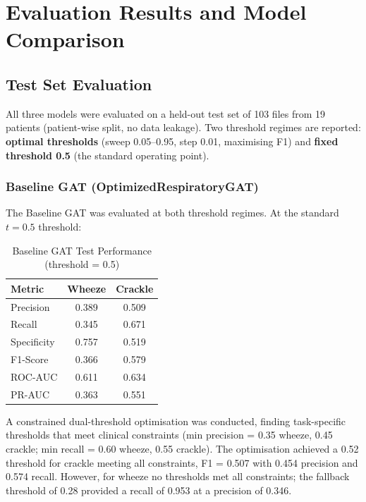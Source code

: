 \section{Evaluation Results and Model Comparison}
\label{sec:evaluation}

\subsection{Test Set Evaluation}

All three models were evaluated on a held-out test set of 103 files from 19
patients (patient-wise split, no data leakage). Two threshold regimes are
reported: \textbf{optimal thresholds} (sweep 0.05--0.95, step 0.01, maximising
F1) and \textbf{fixed threshold 0.5} (the standard operating point).

\subsubsection{Baseline GAT (OptimizedRespiratoryGAT)}

The Baseline GAT was evaluated at both threshold regimes. At the standard
$t=0.5$ threshold:

\begin{table}[!h]
  \renewcommand{\arraystretch}{1.15}
  \caption{Baseline GAT Test Performance (threshold = 0.5)}
  \label{tab:baseline_gat_fixed}
  \centering
  \begin{tabular}{@{}lcc@{}}
    \toprule
    \textbf{Metric} & \textbf{Wheeze} & \textbf{Crackle} \\
    \midrule
    Precision        & 0.389 & 0.509 \\
    Recall           & 0.345 & 0.671 \\
    Specificity      & 0.757 & 0.519 \\
    F1-Score         & 0.366 & 0.579 \\
    ROC-AUC          & 0.611 & 0.634 \\
    PR-AUC           & 0.363 & 0.551 \\
    \bottomrule
  \end{tabular}
\end{table}

A constrained dual-threshold optimisation was conducted, finding task-specific
thresholds that meet clinical constraints (min precision = 0.35 wheeze, 0.45
crackle; min recall = 0.60 wheeze, 0.55 crackle). The optimisation achieved a
0.52 threshold for crackle meeting all constraints, F1 = 0.507 with 0.454
precision and 0.574 recall. However, for wheeze no thresholds met all
constraints; the fallback threshold of 0.28 provided a recall of 0.953 at a
precision of 0.346.

